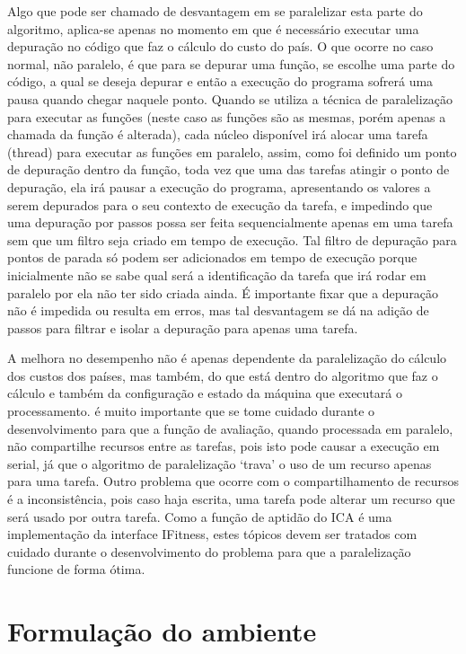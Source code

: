 Algo que pode ser chamado de desvantagem em se paralelizar esta parte do algoritmo, aplica-se apenas no momento em que é necessário executar uma depuração no código que faz o cálculo do custo do país. O que ocorre no caso normal, não paralelo, é que para se depurar uma função, se escolhe uma parte do código, a qual se deseja depurar e então a execução do programa sofrerá uma pausa quando chegar naquele ponto. Quando se utiliza a técnica de paralelização para executar as funções (neste caso as funções são as mesmas, porém apenas a chamada da função é alterada), cada núcleo disponível irá alocar uma tarefa (thread) para executar as funções em paralelo, assim, como foi definido um ponto de depuração dentro da função, toda vez que uma das tarefas atingir o ponto de depuração, ela irá pausar a execução do programa, apresentando os valores a serem depurados para o seu contexto de execução da tarefa, e impedindo que uma depuração por passos possa ser feita sequencialmente apenas em uma tarefa sem que um filtro seja criado em tempo de execução. Tal filtro de depuração para pontos de parada só podem ser adicionados em tempo de execução porque inicialmente não se sabe qual será a identificação da tarefa que irá rodar em paralelo por ela não ter sido criada ainda. É importante fixar que a depuração não é impedida ou resulta em erros, mas tal desvantagem se dá na adição de passos para filtrar e isolar a depuração para apenas uma tarefa.


A melhora no desempenho não é apenas dependente da paralelização do cálculo dos custos dos países, mas também, do que está dentro do algoritmo que faz o cálculo e também da configuração e estado da máquina que executará o processamento. é muito importante que se tome cuidado durante o desenvolvimento para que a função de avaliação, quando processada em paralelo, não compartilhe recursos entre as tarefas, pois isto pode causar a execução em serial, já que o algoritmo de paralelização ‘trava’ o uso de um recurso apenas para uma tarefa. Outro problema que ocorre com o compartilhamento de recursos é a inconsistência, pois caso haja escrita, uma tarefa pode alterar um recurso que será usado por outra tarefa. Como a função de aptidão do ICA é uma implementação da interface IFitness, estes tópicos devem ser tratados com cuidado durante o desenvolvimento do problema para que a paralelização funcione de forma ótima.




\section{Formulação do ambiente}

